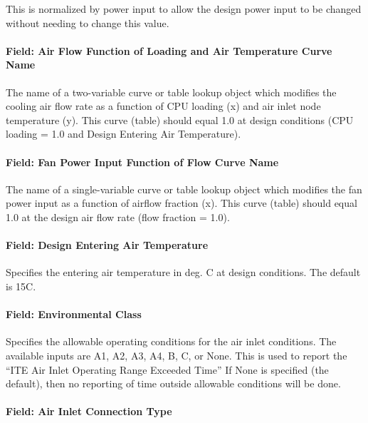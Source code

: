 This is normalized by power input to allow the design power input to be changed without needing to change this value.

\paragraph{Field: Air Flow Function of Loading and Air Temperature Curve Name}\label{field-air-flow-function-of-loading-and-air-temperature-curve-name}

The name of a two-variable curve or table lookup object which modifies the cooling air flow rate as a function of CPU loading (x) and air inlet node temperature (y). This curve (table) should equal 1.0 at design conditions (CPU loading = 1.0 and Design Entering Air Temperature).

\paragraph{Field: Fan Power Input Function of Flow Curve Name}\label{field-fan-power-input-function-of-flow-curve-name}

The name of a single-variable curve or table lookup object which modifies the fan power input as a function of airflow fraction (x). This curve (table) should equal 1.0 at the design air flow rate (flow fraction = 1.0).

\paragraph{Field: Design Entering Air Temperature}\label{field-design-entering-air-temperature}

Specifies the entering air temperature in deg. C at design conditions. The default is 15C.

\paragraph{Field: Environmental Class}\label{field-environmental-class}

Specifies the allowable operating conditions for the air inlet conditions. The available inputs are A1, A2, A3, A4, B, C, or None. This is used to report the ``ITE Air Inlet Operating Range Exceeded Time'' If None is specified (the default), then no reporting of time outside allowable conditions will be done.

\paragraph{Field: Air Inlet Connection Type}\label{field-air-inlet-connection-type}

